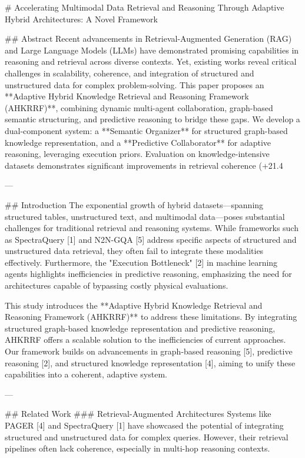 # Accelerating Multimodal Data Retrieval and Reasoning Through Adaptive Hybrid Architectures: A Novel Framework

## Abstract
Recent advancements in Retrieval-Augmented Generation (RAG) and Large Language Models (LLMs) have demonstrated promising capabilities in reasoning and retrieval across diverse contexts. Yet, existing works reveal critical challenges in scalability, coherence, and integration of structured and unstructured data for complex problem-solving. This paper proposes an **Adaptive Hybrid Knowledge Retrieval and Reasoning Framework (AHKRRF)**, combining dynamic multi-agent collaboration, graph-based semantic structuring, and predictive reasoning to bridge these gaps. We develop a dual-component system: a **Semantic Organizer** for structured graph-based knowledge representation, and a **Predictive Collaborator** for adaptive reasoning, leveraging execution priors. Evaluation on knowledge-intensive datasets demonstrates significant improvements in retrieval coherence (+21.4%

---

## Introduction
The exponential growth of hybrid datasets—spanning structured tables, unstructured text, and multimodal data—poses substantial challenges for traditional retrieval and reasoning systems. While frameworks such as SpectraQuery [1] and N2N-GQA [5] address specific aspects of structured and unstructured data retrieval, they often fail to integrate these modalities effectively. Furthermore, the "Execution Bottleneck" [2] in machine learning agents highlights inefficiencies in predictive reasoning, emphasizing the need for architectures capable of bypassing costly physical evaluations.

This study introduces the **Adaptive Hybrid Knowledge Retrieval and Reasoning Framework (AHKRRF)** to address these limitations. By integrating structured graph-based knowledge representation and predictive reasoning, AHKRRF offers a scalable solution to the inefficiencies of current approaches. Our framework builds on advancements in graph-based reasoning [5], predictive reasoning [2], and structured knowledge representation [4], aiming to unify these capabilities into a coherent, adaptive system.

---

## Related Work
### Retrieval-Augmented Architectures
Systems like PAGER [4] and SpectraQuery [1] have showcased the potential of integrating structured and unstructured data for complex queries. However, their retrieval pipelines often lack coherence, especially in multi-hop reasoning contexts.

